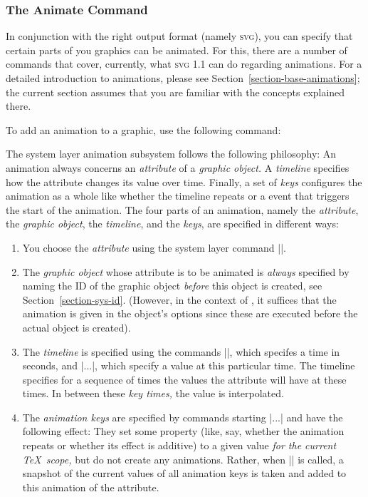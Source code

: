 \subsubsection{The Animate Command}

In conjunction with the right output format (namely
\textsc{svg}), you can specify that certain parts of you graphics can
be animated. For this, there are a number of commands that
cover, currently, what \textsc{svg 1.1} can do regarding animations.
For a detailed introduction to animations, please see
Section~\ref{section-base-animations}; the current section assumes that you
are familiar with the concepts explained there.

To add an animation to a graphic, use the following command:

\begin{command}{\pgfsys@animate{}}
  The system layer animation subsystem follows the following
  philosophy: An animation always concerns an \emph{attribute} of a
  \emph{graphic object.} A \emph{timeline} specifies how the attribute
  changes its value over 
  time. Finally, a set of \emph{keys} configures the animation as a
  whole like whether the timeline repeats or a event that triggers the
  start of the animation. The four parts of an animation, namely the
  \emph{attribute}, the \emph{graphic object}, the \emph{timeline}, and
  the \emph{keys}, are specified in different ways: 

  \begin{enumerate}
  \item You choose the \emph{attribute} using the system layer command
    |\pgfsys@animate|.
  \item The \emph{graphic object} whose attribute is to be animated is
    \emph{always} specified by naming the ID of the graphic object
    \emph{before} this object is created, see
    Section~\ref{section-sys-id}. (However, in the context of
    \tikzname, it suffices that the animation is given in the object's
    options since these are executed before the actual object is
    created).
  \item The \emph{timeline} is specified using the commands
    |\pgfsys@animation@time|, which specifes a time in seconds, and
    |\pgfsys@animation@val...|, which specify a value at this particular
    time. The timeline specifies for a sequence of times the values the
    attribute will have at these times. In between these \emph{key
      times,} the value is interpolated.
  \item The \emph{animation keys} are specified by commands starting
    |\pgfsys@animation@...| and have the following effect: They set some
    property (like, say, whether the animation repeats or whether its
    effect is additive) to a given value \emph{for the current \TeX\
      scope,} but do not create any animations. Rather, when
    |\pgfsys@animate| is called, a snapshot of the current 
    values of all animation keys is taken and added to this animation of
    the attribute.
    

\end{enumerate}
\end{command}
